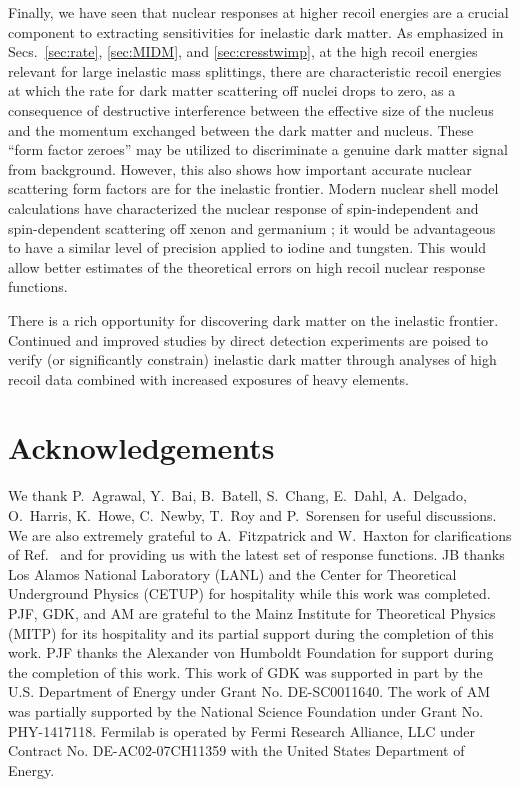 \documentclass[11pt]{article}
\begin{document}
Finally, we have seen that nuclear responses at higher recoil
energies are a crucial component to extracting sensitivities
for inelastic dark matter.   As emphasized in 
Secs.~\ref{sec:rate}, \ref{sec:MIDM}, and \ref{sec:cresstwimp}, 
at the high recoil energies relevant for large inelastic mass splittings,
there are characteristic recoil energies at which the rate for 
dark matter scattering off nuclei drops to zero, as a consequence 
of destructive interference between the effective size of the nucleus 
and the momentum exchanged between the dark matter and nucleus. 
These ``form factor zeroes'' may be utilized to discriminate a genuine 
dark matter signal from background. However, this also shows how 
important accurate nuclear scattering form factors are for the 
inelastic frontier. Modern nuclear shell model calculations 
have characterized the nuclear response of spin-independent and 
spin-dependent scattering off xenon and germanium
\cite{Klos:2013rwa,Vietze:2014vsa}; 
it would be advantageous to have a similar level of precision
applied to iodine and tungsten.
This would allow better estimates of the theoretical errors on 
high recoil nuclear response functions. 

There is a rich opportunity for discovering dark matter on the 
inelastic frontier.  Continued and improved studies by direct detection
experiments are poised to verify (or significantly constrain)
inelastic dark matter through analyses of high recoil data combined 
with increased exposures of heavy elements.  



\section*{Acknowledgements}

We thank 
P.~Agrawal,
Y.~Bai,
B.~Batell,
S.~Chang,
E.~Dahl,
A.~Delgado,
O.~Harris,
K.~Howe,
C.~Newby,
T.~Roy  
and
P.~Sorensen  
for useful discussions. We are also extremely grateful to A.~Fitzpatrick and W.~Haxton for clarifications of Ref.~\cite{Anand:2013yka} and for providing us with the latest set of response functions.  JB thanks Los Alamos National Laboratory (LANL) and the Center for Theoretical Underground Physics (CETUP) for hospitality while this work was completed.  PJF, GDK, and AM are grateful to the Mainz Institute for Theoretical Physics (MITP) for its hospitality and its partial support during the completion of this work.  PJF thanks the Alexander von Humboldt Foundation for support during the completion of this work. This work of GDK was supported in part by the U.S. Department of Energy under Grant No. DE-SC0011640. The work of AM was partially supported by the National Science Foundation under Grant No. PHY-1417118.  Fermilab is operated by Fermi Research Alliance, LLC under Contract No. DE-AC02-07CH11359 with the United States Department of Energy.  
\end{document}
